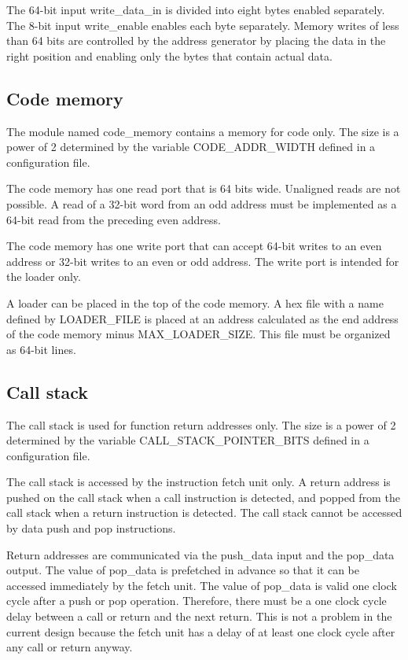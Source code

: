 \documentclass[11pt,a4paper,oneside,openright]{report}
\newcommand{\vv}{ \vspace{2mm} }   %
\begin{document}
The 64-bit input write\_data\_in is divided into eight bytes enabled separately. The 8-bit input write\_enable enables each byte separately. Memory writes of less than 64 bits are controlled by the address generator by placing the data in the right position and enabling only the bytes that contain actual data.
\vv


\subsection{Code memory}
The module named code\_memory contains a memory for code only. The size is a power of 2 determined by the variable CODE\_ADDR\_WIDTH defined in a configuration file.
\vv

The code memory has one read port that is 64 bits wide. Unaligned reads are not possible. A read of a 32-bit word from an odd address must be implemented as a 64-bit read from the preceding even address.
\vv

The code memory has one write port that can accept 64-bit writes to an even address or 32-bit writes to an even or odd address. The write port is intended for the loader only.
\vv

A loader can be placed in the top of the code memory. A hex file with a name defined by LOADER\_FILE is placed at an address calculated as the end address of the code memory minus MAX\_LOADER\_SIZE. This file must be organized as 64-bit lines.
\vv


\subsection{Call stack}
The call stack is used for function return addresses only. The size is a power of 2 determined by the variable CALL\_STACK\_POINTER\_BITS defined in a configuration file.
\vv

The call stack is accessed by the instruction fetch unit only. A return address is pushed on the call stack when a call instruction is detected, and popped from the call stack when a return instruction is detected. The call stack cannot be accessed by data push and pop instructions.
\vv

Return addresses are communicated via the push\_data input and the pop\_data output. The value of pop\_data is prefetched in advance so that it can be accessed immediately by the fetch unit. The value of pop\_data is valid one clock cycle after a push or pop operation. Therefore, there must be a one clock cycle delay between a call or return and the next return. This is not a problem in the current design because the fetch unit has a delay of at least one clock cycle after any call or return anyway.
\vv
\end{document}
